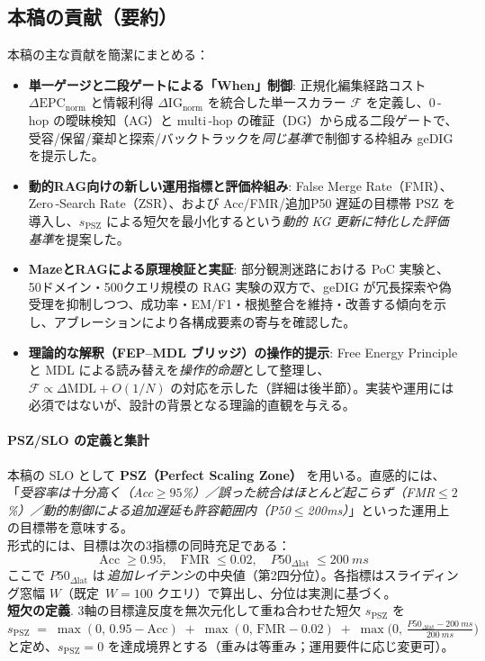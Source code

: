 \documentclass[ja=standard,xelatex]{bxjsarticle}
\newcommand{\F}{\mathcal{F}}
\newcommand{\gednorm}{\Delta\mathrm{EPC}_{\mathrm{norm}}}
\newcommand{\ignorm}{\Delta\mathrm{IG}_{\mathrm{norm}}}
\begin{document}
\subsection*{本稿の貢献（要約）}
本稿の主な貢献を簡潔にまとめる：
\begin{itemize}[leftmargin=1.6em]
  \item \textbf{単一ゲージと二段ゲートによる「When」制御}: 正規化編集経路コスト $\gednorm$ と情報利得 $\ignorm$ を統合した単一スカラー $\F$ を定義し、0\,\mbox{-}hop の曖昧検知（AG）と multi\,\mbox{-}hop の確証（DG）から成る二段ゲートで、受容/保留/棄却と探索/バックトラックを\emph{同じ基準}で制御する枠組み geDIG を提示した。
  \item \textbf{動的RAG向けの新しい運用指標と評価枠組み}: False Merge Rate（FMR）、Zero\,\mbox{-}Search Rate（ZSR）、および Acc/FMR/追加P50 遅延の目標帯 PSZ を導入し、$s_{\mathrm{PSZ}}$ による短欠を最小化するという\emph{動的 KG 更新に特化した評価基準}を提案した。
  \item \textbf{MazeとRAGによる原理検証と実証}: 部分観測迷路における PoC 実験と、50ドメイン・500クエリ規模の RAG 実験の双方で、geDIG が冗長探索や偽受理を抑制しつつ、成功率・EM/F1・根拠整合を維持・改善する傾向を示し、アブレーションにより各構成要素の寄与を確認した。
  \item \textbf{理論的な解釈（FEP--MDL ブリッジ）の操作的提示}: Free Energy Principle と MDL による読み替えを\emph{操作的命題}として整理し、$\F\propto\Delta\mathrm{MDL}{+}O(1/N)$ の対応を示した（詳細は後半節）。実装や運用には必須ではないが、設計の背景となる理論的直観を与える。
\end{itemize}

\paragraph{PSZ/SLO の定義と集計} 本稿の SLO として \textbf{PSZ（Perfect Scaling Zone）} を用いる。直感的には、「\emph{受容率は十分高く（Acc$\ge95$\%）／誤った統合はほとんど起こらず（FMR$\le2$\%）／動的制御による追加遅延も許容範囲内（P50$\le$200ms）}」といった運用上の目標帯を意味する。\\
\noindent 形式的には、目標は次の3指標の同時充足である：
\begin{equation}
  \mathrm{Acc}\;\ge 0.95,\quad \mathrm{FMR}\;\le 0.02,\quad P50_{\Delta \mathrm{lat}}\;\le \SI{200}{ms} \label{eq:psz_targets}
\end{equation}
ここで $P50_{\Delta \mathrm{lat}}$ は\,\emph{追加レイテンシ}の中央値（第2四分位）。各指標はスライディング窓幅 $W$（既定 \,$W{=}100$ クエリ）で算出し、分位は実測に基づく。\\
\noindent \textbf{短欠の定義}. 3軸の目標違反度を無次元化して重ね合わせた短欠 $s_{\mathrm{PSZ}}$ を
\begin{equation}
  s_{\mathrm{PSZ}}\;=\;\max(0,\,0.95{-}\mathrm{Acc})\; +\; \max(0,\,\mathrm{FMR}{-}0.02)\; +\; \max\!\bigl(0,\,\tfrac{P50_{\Delta \mathrm{lat}}{-}\SI{200}{ms}}{\SI{200}{ms}}\bigr) \label{eq:psz_deficit}
\end{equation}
と定め、$s_{\mathrm{PSZ}}{=}0$ を達成境界とする（重みは等重み；運用要件に応じ変更可）。
\end{document}
